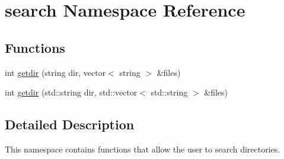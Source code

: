 \hypertarget{namespacesearch}{\section{search Namespace Reference}
\label{namespacesearch}
}
\subsection*{Functions}
\begin{DoxyCompactItemize}
\item 
int \hyperlink{namespacesearch_a2f52a0545d237d7a566fcaa887bdc784}{getdir} (string dir, vector$<$ string $>$ \&files)
\item 
int \hyperlink{namespacesearch_aca625fab72dc71c5ebdabd84169040e1}{getdir} (std\+::string dir, std\+::vector$<$ std\+::string $>$ \&files)
\end{DoxyCompactItemize}


\subsection{Detailed Description}
This namespace contains functions that allow the user to search directories. 

